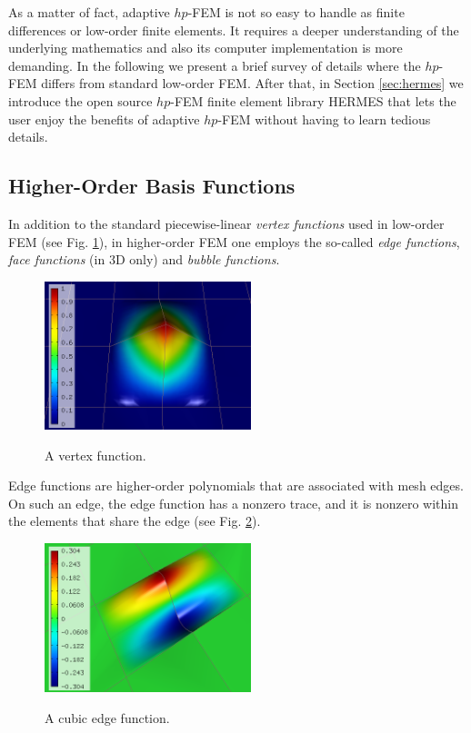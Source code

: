 \documentclass[final,3p,times,twocolumn]{elsarticle}
\begin{document}
As a matter of fact, adaptive $hp$-FEM is not so easy to handle 
as finite differences or low-order finite elements. It requires 
a deeper understanding of the underlying mathematics and also its 
computer implementation is more demanding. In the following 
we present a brief survey of details where the $hp$-FEM
differs from standard low-order FEM. After that, in Section 
\ref{sec:hermes} we introduce the open source $hp$-FEM finite 
element library HERMES that lets the user enjoy the benefits 
of adaptive $hp$-FEM without having to learn tedious details.

\subsection{Higher-Order Basis Functions}

In addition to the standard piecewise-linear
{\em vertex functions} used in low-order
FEM (see Fig. \ref{fig:vertex-fn}), 
in higher-order FEM one employs 
the so-called {\em edge functions}, 
{\em face functions} (in 3D only) and 
{\em bubble functions}.

\begin{figure}[!htb]
\begin{center}
 {
\includegraphics[width=6cm]{fn_vertex.png}
}
\end{center}
\caption{A vertex function.}
\label{fig:vertex-fn}
\end{figure}

Edge functions are higher-order polynomials
that are associated with mesh edges. On such 
an edge, the edge function has a nonzero trace,
and it is nonzero within the elements that share
the edge (see Fig. \ref{fig:edge-fn}).

\begin{figure}[!htb]
\begin{center}
 {
\includegraphics[width=6cm]{fn_edge.png}
}
\end{center}
\caption{A cubic edge function.}
\label{fig:edge-fn}
\end{figure}
\end{document}
